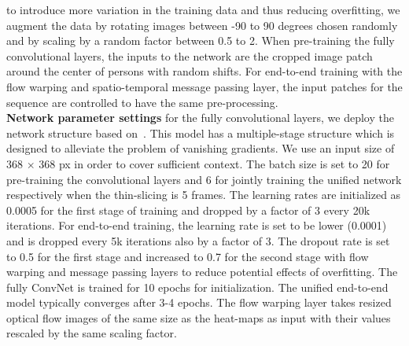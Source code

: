 \documentclass[10pt,twocolumn,letterpaper]{article}
\begin{document}
to introduce more variation in the training data and thus reducing overfitting, we augment the data by rotating images between -90 to 90 degrees chosen randomly and by scaling by a random factor between 0.5 to 2. When pre-training the fully convolutional layers, the inputs to the network are the cropped image patch around the center of persons with random shifts. For end-to-end training with the flow warping and spatio-temporal message passing layer, the input patches for the sequence are controlled to have the same pre-processing.  \\

\noindent\textbf{Network parameter settings}
for the fully convolutional layers, we deploy the network structure based on~\cite{wei2016cpm}. This model has a multiple-stage structure which is designed to alleviate the problem of vanishing gradients. We use an input size of 368 $\times$ 368 px in order to cover sufficient context. The batch size is set to 20 for pre-training the convolutional layers and 6 for jointly training the unified network respectively when the thin-slicing is 5 frames. The learning rates are initialized as 0.0005 for the first stage of training and dropped by a factor of 3 every 20k iterations. For end-to-end training, the learning rate is set to be lower (0.0001) and is dropped every 5k iterations also by a factor of 3. The dropout rate is set to 0.5 for the first stage and increased to 0.7 for the second stage with flow warping and message passing layers to reduce potential effects of overfitting. The fully ConvNet is trained for 10 epochs for initialization. The unified end-to-end model typically converges after 3-4 epochs. The flow warping layer takes resized optical flow images of the same size as the heat-maps as input with their values rescaled by the same scaling factor.
\end{document}
